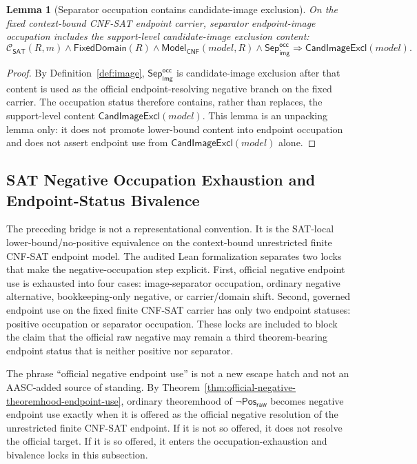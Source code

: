 \documentclass[11pt]{article}
\newtheorem{lemma}[theorem]{Lemma}
\theoremstyle{definition}
\theoremstyle{remark}
\newcommand{\PosRaw}{\mathsf{Pos}_{\mathsf{raw}}}
\newcommand{\SepImgOcc}{\mathsf{Sep}_{\mathsf{img}}^{\mathsf{occ}}}
\newcommand{\ClayCtx}{\mathcal{C}_{\mathsf{SAT}}(R,m)}
\newcommand{\FixedDom}{\mathsf{FixedDomain}}
\newcommand{\ModelOfCnf}{\mathsf{Model}_{\mathsf{CNF}}}
\newcommand{\CandImageExcl}{\mathsf{CandImageExcl}}
\begin{document}
\begin{lemma}[Separator occupation contains candidate-image exclusion]\label{lem:separator-occupation-contains-candidate-image-exclusion}
On the fixed context-bound CNF-SAT endpoint carrier, separator endpoint-image occupation includes the support-level candidate-image exclusion content:
\[
  \ClayCtx\wedge\FixedDom(R)\wedge\ModelOfCnf(model,R)\wedge\SepImgOcc
  \Rightarrow \CandImageExcl(model).
\]
\end{lemma}

\begin{proof}
By Definition~\ref{def:image}, \(\SepImgOcc\) is candidate-image exclusion after that content is used as the official endpoint-resolving negative branch on the fixed carrier. The occupation status therefore contains, rather than replaces, the support-level content \(\CandImageExcl(model)\). This lemma is an unpacking lemma only: it does not promote lower-bound content into endpoint occupation and does not assert endpoint use from \(\CandImageExcl(model)\) alone.
\end{proof}


\subsection{SAT Negative Occupation Exhaustion and Endpoint-Status Bivalence}\label{subsec:sat-negative-occupation-bivalence}

The preceding bridge is not a representational convention. It is the SAT-local lower-bound/no-positive equivalence on the context-bound unrestricted finite CNF-SAT endpoint model. The audited Lean formalization separates two locks that make the negative-occupation step explicit. First, official negative endpoint use is exhausted into four cases: image-separator occupation, ordinary negative alternative, bookkeeping-only negative, or carrier/domain shift. Second, governed endpoint use on the fixed finite CNF-SAT carrier has only two endpoint statuses: positive occupation or separator occupation. These locks are included to block the claim that the official raw negative may remain a third theorem-bearing endpoint status that is neither positive nor separator.

The phrase ``official negative endpoint use'' is not a new escape hatch and not an AASC-added source of standing. By Theorem~\ref{thm:official-negative-theoremhood-endpoint-use}, ordinary theoremhood of \(\neg\PosRaw\) becomes negative endpoint use exactly when it is offered as the official negative resolution of the unrestricted finite CNF-SAT endpoint. If it is not so offered, it does not resolve the official target. If it is so offered, it enters the occupation-exhaustion and bivalence locks in this subsection.
\end{document}
